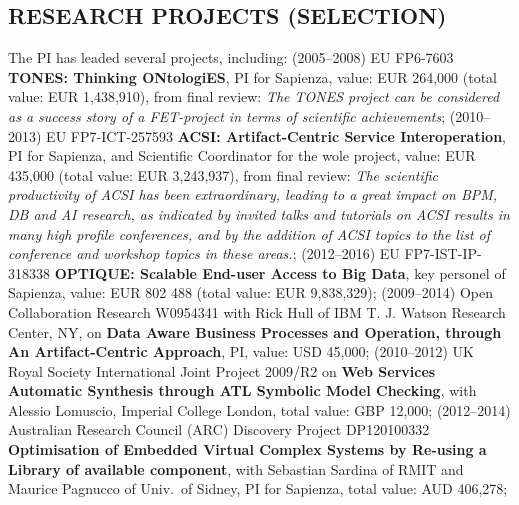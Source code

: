 

\vspace{-3ex}
\subsection*{RESEARCH PROJECTS (SELECTION)}
\vspace{-3ex}
The PI has leaded several projects, including:
%
(2005--2008) EU FP6-7603 \textbf{TONES: Thinking ONtologiES}, PI for Sapienza, value: EUR 264,000  (total value: EUR 1,438,910), from final review:  \emph{The TONES project can be considered as a success story of a FET-project in terms of scientific achievements};
(2010--2013) EU FP7-ICT-257593 \textbf{ACSI: Artifact-Centric Service
  Interoperation}, PI for Sapienza, and Scientific Coordinator for the wole project, value: EUR 435,000 (total value:
EUR 3,243,937), from final review: \emph{The scientific productivity
of ACSI has been extraordinary, leading to a great impact on BPM, DB
and AI research, as indicated by invited talks and tutorials on ACSI
results in many high profile conferences, and by the addition of ACSI
topics to the list of conference and workshop topics in these
areas.};
(2012--2016) EU FP7-IST-IP-318338 \textbf{OPTIQUE: Scalable End-user Access to Big Data}, key personel of Sapienza, value: EUR 802 488  (total  value: EUR 9,838,329);
(2009--2014) Open Collaboration Research %
W0954341 with Rick Hull of IBM T. J. Watson Research Center, NY, on \textbf{Data Aware Business Processes and Operation, through An Artifact-Centric Approach}, PI, value: USD 45,000;
(2010--2012) UK Royal Society International Joint Project 2009/R2 on \textbf{Web Services Automatic Synthesis through ATL Symbolic Model Checking}, with Alessio Lomuscio, Imperial College London, total value: GBP 12,000;
(2012--2014) Australian Research Council  (ARC) %
Discovery Project DP120100332 \textbf{Optimisation of Embedded Virtual Complex Systems by Re-using a Library of available component}, with Sebastian Sardina of RMIT and Maurice Pagnucco of Univ.\ of Sidney, PI for Sapienza, total  value: AUD 406,278;
